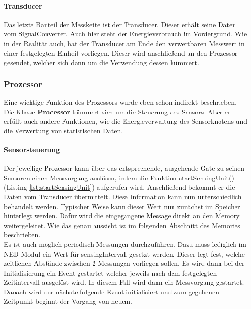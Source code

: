 \paragraph{Transducer}

Das letzte Bauteil der Messkette ist der Transducer. Dieser erhält seine Daten vom SignalConverter. Auch hier steht der Energieverbrauch im Vordergrund. Wie in der Realität auch, hat der Transducer am Ende den verwertbaren Messwert in einer festgelegten Einheit vorliegen. Dieser wird anschließend an den Prozessor gesendet, welcher sich dann um die Verwendung dessen kümmert.

\subsubsection{Prozessor}

Eine wichtige Funktion des Prozessors wurde eben schon indirekt beschrieben. Die Klasse \textbf{Processor} kümmert sich um die Steuerung des Sensors. Aber er erfüllt auch andere Funktionen, wie die Energieverwaltung des Sensorknotens und die Verwertung von statistischen Daten.

\paragraph{Sensorsteuerung}

Der jeweilige Prozessor kann über das entsprechende, ausgehende Gate zu seinen Sensoren einen Messvorgang auslösen, indem die Funktion startSensingUnit() (Listing \ref{lst:startSensingUnit}) aufgerufen wird. Anschließend bekommt er die Daten vom Transducer übermittelt. Diese Information kann nun unterschiedlich behandelt werden. Typischer Weise kann dieser Wert nun zunächst im Speicher hinterlegt werden. Dafür wird die eingegangene Message direkt an den Memory weitergeleitet. Wie das genau aussieht ist im folgenden Abschnitt des Memories beschrieben.\\
Es ist auch möglich periodisch Messungen durchzuführen. Dazu muss lediglich im NED-Modul ein Wert für sensingIntervall gesetzt werden. Dieser legt fest, welche zeitlichen Abstände zwischen 2 Messungen vorliegen sollen. Es wird dann bei der Initialisierung ein Event gestartet welcher jeweils nach dem festgelegten Zeitintervall ausgelöst wird. In diesem Fall wird dann ein Messvorgang gestartet. Danach wird der nächste folgende Event initialisiert und zum gegebenen Zeitpunkt beginnt der Vorgang von neuem.

